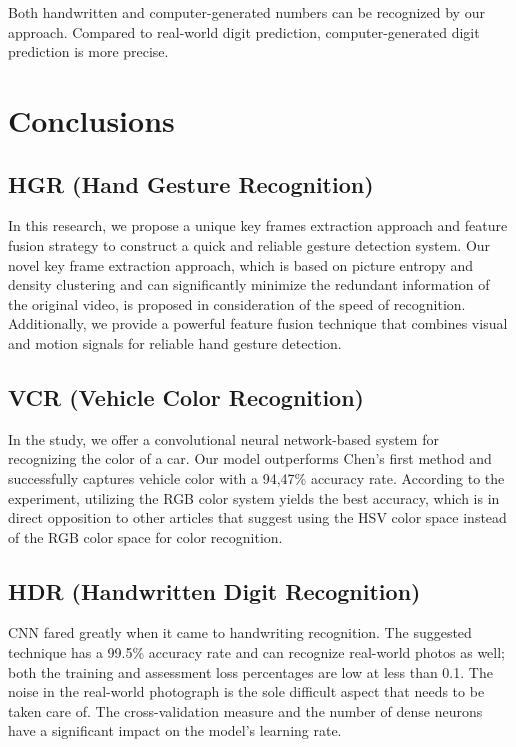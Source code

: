 \documentclass[letterpaper, 10 pt, conference]{ieeeconf}  %
\begin{document}
Both handwritten and computer-generated numbers can be recognized by our approach. Compared to real-world digit prediction, computer-generated digit prediction is more precise.

\section{\bf Conclusions}
\subsection*{\bf HGR (Hand Gesture Recognition)}
In this research, we propose a unique key frames extraction approach and feature fusion strategy to construct a quick and reliable gesture detection system. Our novel key frame extraction approach, which is based on picture entropy and density clustering and can significantly minimize the redundant information of the original video, is proposed in consideration of the speed of recognition. Additionally, we provide a powerful feature fusion technique that combines visual and motion signals for reliable hand gesture detection.

\subsection*{\bf VCR (Vehicle Color Recognition)}
In the study, we offer a convolutional neural network-based system for recognizing the color of a car. Our model outperforms Chen's first method and successfully captures vehicle color with a 94,47\% accuracy rate. According to the experiment, utilizing the RGB color system yields the best accuracy, which is in direct opposition to other articles that suggest using the HSV color space instead of the RGB color space for color recognition.

\subsection*{\bf HDR (Handwritten Digit Recognition)}
CNN fared greatly when it came to handwriting recognition. The suggested technique has a 99.5\% accuracy rate and can recognize real-world photos as well; both the training and assessment loss percentages are low at less than 0.1. The noise in the real-world photograph is the sole difficult aspect that needs to be taken care of. The cross-validation measure and the number of dense neurons have a significant impact on the model's learning rate.


\addtolength{\textheight}{-12cm}   %
\end{document}
